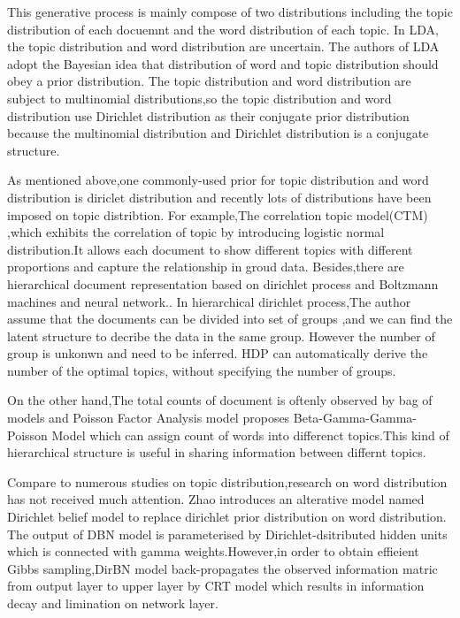 This generative process is mainly compose of two distributions including the topic distribution of each docuemnt and the word distribution of each topic. In LDA, the topic distribution and word distribution are uncertain. The authors of LDA adopt the Bayesian idea that distribution of word and topic distribution should obey a prior distribution. The topic distribution and word distribution are subject to  multinomial distributions,so the topic distribution and word distribution use Dirichlet distribution as their conjugate prior distribution because the multinomial distribution and Dirichlet distribution is a conjugate structure.

As mentioned above,one commonly-used prior for topic distribution and word distribution is diriclet distribution and recently lots of distributions have been imposed on topic distribtion. For example,The correlation topic model(CTM) \cite{corr} ,which exhibits the correlation of topic by introducing logistic normal distribution.It allows each document to show different topics with different proportions and capture the relationship in groud data. Besides,there are hierarchical document representation based on dirichlet process and Boltzmann machines and neural network.\cite{dirbn}. In hierarchical dirichlet process\cite{hdp},The author assume that the documents can be divided into set of groups ,and we can find the latent structure to  decribe the data in the same group. However the number of group is unkonwn and need to be inferred. HDP  can automatically derive the number of the optimal topics, without specifying the number of groups.

On the other hand,The total counts of document is oftenly observed by bag of models and Poisson Factor Analysis model\cite{han} proposes Beta-Gamma-Gamma-Poisson Model which can assign count of words into differenct topics.This kind of hierarchical structure is useful in sharing information between differnt topics.

Compare to numerous studies on topic distribution,research on word distribution has not received much attention. Zhao \cite{dirbn} introduces an alterative model named Dirichlet belief model to replace dirichlet prior distribution on word distribution. The output of DBN model is parameterised by Dirichlet-dsitributed hidden units which is connected with gamma weights.However,in order to obtain effieient Gibbs sampling,DirBN model back-propagates the observed information matric from output layer to upper layer by CRT\cite{crt} model which results in information decay and limination on network layer.

